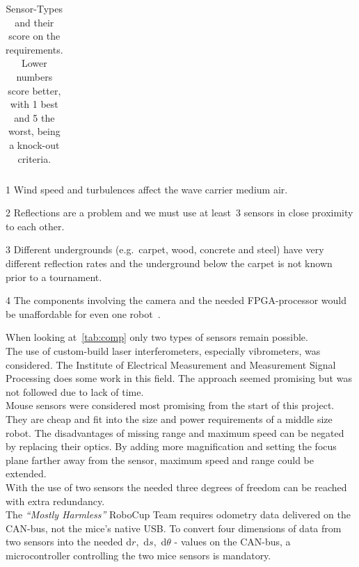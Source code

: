 \documentclass[12pt,a4paper]{article}
\newcommand{\MH}{\emph{``Mostly Harmless''} RoboCup Team\xspace}
\begin{document}
\begin{table}[htbp]
\begin{threeparttable}[b]
\begin{tabular}{rlllllll}
     \hline
  \end{tabular}
  \begin{tablenotes}
  \item [1] Wind speed and turbulences affect the wave carrier medium air.
  \item [2] Reflections are a problem and we must use at least~3 sensors in close proximity to each other.
  \item [3] Different undergrounds (e.g.\ carpet, wood, concrete and steel) have very different reflection rates and the underground below the carpet is not known prior to a tournament.
  \item [4] The components involving the camera and the needed FPGA-processor would be unaffordable for even one robot~\cite{Hrach2006}.
  \end{tablenotes}

  \caption{Sensor-Types and their score on the requirements. Lower numbers score better, with 1 best and 5 the worst, being a knock-out criteria. }
  \label{tab:comp}
 \end{threeparttable}
\end{table}


When looking at~\autoref{tab:comp} only two types of sensors remain possible.\\
The use of custom-build laser interferometers, especially vibrometers, was considered.
The Institute of Electrical Measurement and Measurement Signal Processing does some work in this field.
The approach seemed promising but was not followed due to lack of time.\\
Mouse sensors were considered most promising from the start of this project.
They are cheap and fit into the size and power requirements of a middle size robot.
The disadvantages of missing range and maximum speed can be negated by replacing their optics.
By adding more magnification and setting the focus plane farther away from the sensor, maximum speed and range could be extended.\\
With the use of two sensors the needed three degrees of freedom can be reached with extra redundancy.\\
The \MH requires odometry data delivered on the CAN-bus, not the mice's native USB.
To convert four dimensions of data from two sensors into the needed d$r$,~d$s$,~d$\theta$ - values on the CAN-bus, a microcontroller controlling the two mice sensors is mandatory.
\end{document}
